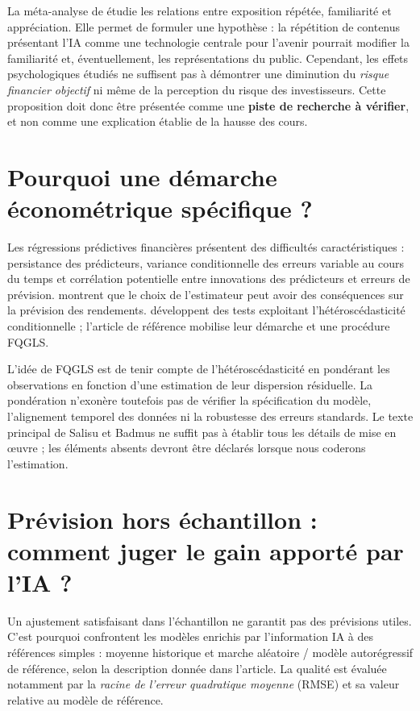 \documentclass[11pt,a4paper]{article}
\begin{document}
La méta-analyse de \cite{Montoya2017} étudie les relations entre exposition répétée, familiarité et appréciation. Elle permet de formuler une hypothèse : la répétition de contenus présentant l'IA comme une technologie centrale pour l'avenir pourrait modifier la familiarité et, éventuellement, les représentations du public. Cependant, les effets psychologiques étudiés ne suffisent pas à démontrer une diminution du \emph{risque financier objectif} ni même de la perception du risque des investisseurs. Cette proposition doit donc être présentée comme une \textbf{piste de recherche à vérifier}, et non comme une explication établie de la hausse des cours.

\section{Pourquoi une démarche économétrique spécifique ?}
Les régressions prédictives financières présentent des difficultés caractéristiques : persistance des prédicteurs, variance conditionnelle des erreurs variable au cours du temps et corrélation potentielle entre innovations des prédicteurs et erreurs de prévision. \cite{WesterlundNarayan2012} montrent que le choix de l'estimateur peut avoir des conséquences sur la prévision des rendements. \cite{WesterlundNarayan2015} développent des tests exploitant l'hétéroscédasticité conditionnelle ; l'article de référence mobilise leur démarche et une procédure FQGLS.

L'idée de FQGLS est de tenir compte de l'hétéroscédasticité en pondérant les observations en fonction d'une estimation de leur dispersion résiduelle. La pondération n'exonère toutefois pas de vérifier la spécification du modèle, l'alignement temporel des données ni la robustesse des erreurs standards. Le texte principal de Salisu et Badmus ne suffit pas à établir tous les détails de mise en œuvre ; les éléments absents devront être déclarés lorsque nous coderons l'estimation.

\clearpage
\section{Prévision hors échantillon : comment juger le gain apporté par l'IA ?}
Un ajustement satisfaisant dans l'échantillon ne garantit pas des prévisions utiles. C'est pourquoi \cite{SalisuBadmus2026} confrontent les modèles enrichis par l'information IA à des références simples : moyenne historique et marche aléatoire / modèle autorégressif de référence, selon la description donnée dans l'article. La qualité est évaluée notamment par la \emph{racine de l'erreur quadratique moyenne} (RMSE) et sa valeur relative au modèle de référence.
\end{document}

